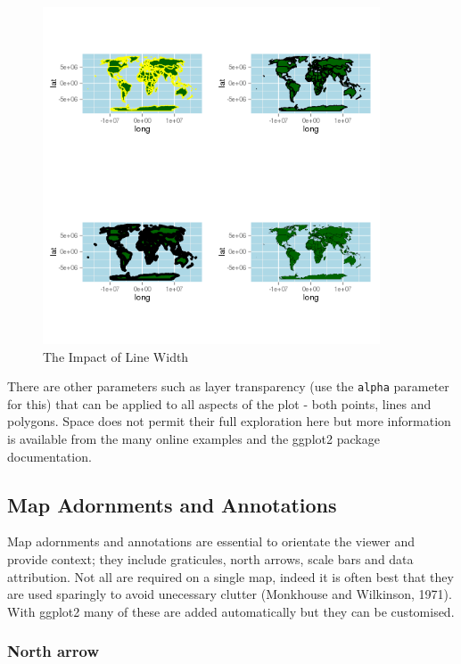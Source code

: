 \documentclass[]{article}
\let\Oldincludegraphics\includegraphics
\renewcommand{\includegraphics}[1]{\Oldincludegraphics[width=10cm]{#1}}
\begin{document}
\begin{figure}[htbp]
\centering
\includegraphics{figure/The_Impact_of_Line_Width.png}
\caption{The Impact of Line Width}
\end{figure}

There are other parameters such as layer transparency (use the
\texttt{alpha} parameter for this) that can be applied to all aspects of
the plot - both points, lines and polygons. Space does not permit their
full exploration here but more information is available from the many
online examples and the ggplot2 package documentation.

\subsection{Map Adornments and Annotations}

Map adornments and annotations are essential to orientate the viewer and
provide context; they include graticules, north arrows, scale bars and
data attribution. Not all are required on a single map, indeed it is
often best that they are used sparingly to avoid unecessary clutter
(Monkhouse and Wilkinson, 1971). With ggplot2 many of these are added
automatically but they can be customised.

\subsubsection{North arrow}
\end{document}
